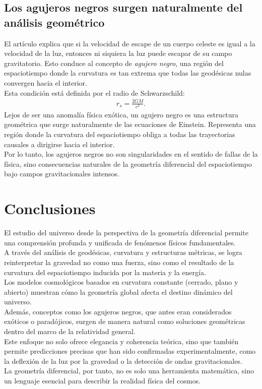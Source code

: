 \documentclass{aleph-revista}
\begin{document}
\subsection*{Los agujeros negros surgen naturalmente del análisis geométrico}
El artículo explica que si la velocidad de escape de un cuerpo celeste es igual a la velocidad de la luz, entonces ni siquiera la luz puede escapar de su campo gravitatorio. Esto conduce al concepto de \textit{agujero negro}, una región del espaciotiempo donde la curvatura es tan extrema que todas las geodésicas nulas convergen hacia el interior.\\
Esta condición está definida por el radio de Schwarzschild:
\begin{align*}
r_s = \frac{2GM}{c^2}.
\end{align*}
Lejos de ser una anomalía física exótica, un agujero negro es una estructura geométrica que surge naturalmente de las ecuaciones de Einstein. Representa una región donde la curvatura del espaciotiempo obliga a todas las trayectorias causales a dirigirse hacia el interior.\\
Por lo tanto, los agujeros negros no son singularidades en el sentido de fallas de la física, sino consecuencias naturales de la geometría diferencial del espaciotiempo bajo campos gravitacionales intensos.
\section{Conclusiones}
El estudio del universo desde la perspectiva de la geometría diferencial permite una comprensión profunda y unificada de fenómenos físicos fundamentales.\\
A través del análisis de geodésicas, curvatura y estructuras métricas, se logra reinterpretar la gravedad no como una fuerza, sino como el resultado de la curvatura del espaciotiempo inducida por la materia y la energía.\\
Los modelos cosmológicos basados en curvatura constante (cerrado, plano y abierto) muestran cómo la geometría global afecta el destino dinámico del universo.\\
Además, conceptos como los agujeros negros, que antes eran considerados exóticos o paradójicos, surgen de manera natural como soluciones geométricas dentro del marco de la relatividad general.\\
Este enfoque no solo ofrece elegancia y coherencia teórica, sino que también permite predicciones precisas que han sido confirmadas experimentalmente, como la deflexión de la luz por la gravedad o la detección de ondas gravitacionales.\\
La geometría diferencial, por tanto, no es solo una herramienta matemática, sino un lenguaje esencial para describir la realidad física del cosmos.
\newpage
\nocite{*}
\printbibliography
\end{document}
